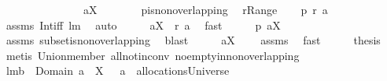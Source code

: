 \begin{isabellebody}
\ \ \ \ \ \ \ \ \ \ \ \ \ \ \ {\isachardoublequoteopen}{\isasymUnion}{\isacharparenleft}a{\isacharbackquote}{\isacharbackquote}X{\isacharparenright}\ {\isasymnoteq}\ {\isacharbraceleft}{\isacharbraceright}{\isachardoublequoteclose}\isanewline
%
\isadelimproof
%
\endisadelimproof
%
\isatagproof
{}\isamarkupfalse%
\ {\isacharminus}\isanewline
\ \ \isamarkupfalse%
\ {\isacharquery}p{\isacharequal}is{\isacharunderscore}non{\isacharunderscore}overlapping\ \isamarkupfalse%
\ {\isacharquery}r{\isacharequal}Range\isanewline
\ \ \isamarkupfalse%
\ {\isachardoublequoteopen}{\isacharquery}p\ {\isacharparenleft}{\isacharquery}r\ a{\isacharparenright}{\isachardoublequoteclose}\ \isamarkupfalse%
\ assms\ Int{\isacharunderscore}iff\ lm{}{}\ \isamarkupfalse%
\ auto\isanewline
\ \ \isamarkupfalse%
\ \isamarkupfalse%
\ {\isachardoublequoteopen}a{\isacharbackquote}{\isacharbackquote}X\ {\isasymsubseteq}\ {\isacharquery}r\ a{\isachardoublequoteclose}\ \isamarkupfalse%
\ fast\isanewline
\ \ \isamarkupfalse%
\ \isamarkupfalse%
\ {\isachardoublequoteopen}{\isacharquery}p\ {\isacharparenleft}a{\isacharbackquote}{\isacharbackquote}X{\isacharparenright}{\isachardoublequoteclose}\ \isamarkupfalse%
\ assms\ subset{\isacharunderscore}is{\isacharunderscore}non{\isacharunderscore}overlapping\ \isamarkupfalse%
\ blast\isanewline
\ \ \isamarkupfalse%
\ \isamarkupfalse%
\ {\isachardoublequoteopen}a{\isacharbackquote}{\isacharbackquote}X\ {\isasymnoteq}\ {\isacharbraceleft}{\isacharbraceright}{\isachardoublequoteclose}\ \isamarkupfalse%
\ assms\ \isamarkupfalse%
\ fast\isanewline
\ \ \isamarkupfalse%
\ \isamarkupfalse%
\ {\isacharquery}thesis\ \isamarkupfalse%
\ {\isacharparenleft}metis\ Union{\isacharunderscore}member\ all{\isacharunderscore}not{\isacharunderscore}in{\isacharunderscore}conv\ no{\isacharunderscore}empty{\isacharunderscore}in{\isacharunderscore}non{\isacharunderscore}overlapping{\isacharparenright}\isanewline
{}\isamarkupfalse%
%
\endisatagproof
{\isafoldproof}%
%
\isadelimproof
\isanewline
%
\endisadelimproof
\isanewline
\isanewline
{}\isamarkupfalse%
\ lm{}{}b{\isacharcolon}\ \ {\isachardoublequoteopen}Domain\ a\ {\isasyminter}\ X\ {\isasymnoteq}\ {\isacharbraceleft}{\isacharbraceright}{\isachardoublequoteclose}\ {\isachardoublequoteopen}a\ {\isasymin}\ allocationsUniverse{\isachardoublequoteclose}\ \isanewline

\end{isabellebody}
